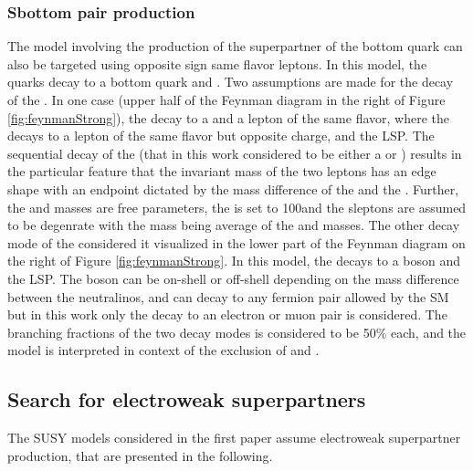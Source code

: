 \subsubsection*{Sbottom pair production}
\noindent\justify
The model involving the production of the superpartner of the bottom quark can also be targeted using opposite sign same flavor leptons.
In this model, the \sbottom quarks decay to a bottom quark and \PSGczDt. 
Two assumptions are made for the decay of the \PSGczDt. 
In one case (upper half of the Feynman diagram in the right of Figure \ref{fig:feynmanStrong}), the \PSGczDt decay to a \slep and a lepton of the same flavor, where the \slep decays to a lepton of the same flavor but opposite charge, and the \PSGczDo LSP.   
The sequential decay of the \slep (that in this work considered to be either a \se or \sm) results in the particular feature that the invariant mass of the two leptons has an edge shape with an endpoint dictated by the mass difference of the \PSGczDt and the \PSGczDo. 
Further, the \sbottom and \PSGczDt masses are free parameters, the \PSGczDo is set to 100\GeV and the sleptons are assumed to be degenrate with the mass being average of the \PSGczDt and \PSGczDo masses. 
The other decay mode of the \PSGczDt considered it visualized in the lower part of the Feynman diagram on the right of Figure \ref{fig:feynmanStrong}.
In this model, the \PSGczDt decays to a \PZ boson and the \PSGczDo LSP. 
The \PZ boson can be on-shell or off-shell depending on the mass difference between the neutralinos, and can decay to any fermion pair allowed by the SM but in this work only the decay to an electron or muon pair is considered. 
The branching fractions of the two \PSGczDt decay modes is considered to be 50\% each, and the model is interpreted in context of the exclusion of \sbottom and \PSGczDt. 
\subsection*{Search for electroweak superpartners}\label{sec:searchEWK}
\noindent\justify
The SUSY models considered in the first paper assume electroweak superpartner production, that are presented in the following. 
